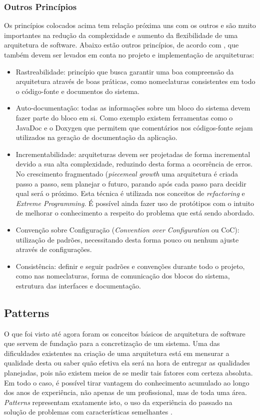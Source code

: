 \documentclass[diss]{template/setrem}
\begin{document}
\subsubsection{Outros Princípios}
Os princípios colocados acima tem relação próxima uns com os outros e são muito importantes na redução da complexidade e aumento da flexibilidade de uma arquitetura de software. Abaixo estão outros princípios, de acordo com \citet{Vogel2011}, que também devem ser levados em conta no projeto e implementação de arquiteturas:
\begin{itemize}
	\item Rastreabilidade: princípio que busca garantir uma boa compreensão da arquitetura através de boas práticas, como nomeclaturas consistentes em todo o código-fonte e documentos do sistema.
	\item Auto-documentação: todas as informações sobre um bloco do sistema devem fazer parte do bloco em si. Como exemplo existem ferramentas como o JavaDoc e o Doxygen que permitem que comentários nos códigos-fonte sejam utilizados na geração de documentação da aplicação.
	\item Incrementabilidade: arquiteturas devem ser projetadas de forma incremental devido a sua alta complexidade, reduzindo desta forma a ocorrência de erros. No crescimento fragmentado (\emph{piecemeal growth} uma arquitetura é criada passo a passo, sem planejar o futuro, parando após cada passo para decidir qual será o próximo. Esta técnica é utilizada nos conceitos de \emph{refactoring} e \emph{Extreme Programming}. É possível ainda fazer uso de protótipos com o intuito de melhorar o conhecimento a respeito do problema que está sendo abordado.
	\item Convenção sobre Configuração (\emph{Convention over Configuration} ou CoC): utilização de padrões, necessitando desta forma pouco ou nenhum ajuste através de configurações.
	\item Consistência: definir e seguir padrões e convenções durante todo o projeto, como nas nomeclaturas, forma de comunicação dos blocos do sistema, estrutura das interfaces e documentação.
\end{itemize}

\subsection{Patterns}
O que foi visto até agora foram os conceitos básicos de arquitetura de software que servem de fundação para a concretização de um sistema. Uma das dificuldades existentes na criação de uma arquitetura está em mensurar a qualidade desta ou saber quão efetiva ela será na hora de entregar as qualidades planejadas, pois não existem meios de se medir tais fatores com certeza absoluta. Em todo o caso, é possível tirar vantagem do conhecimento acumulado ao longo dos anos de experiência, não apenas de um profissional, mas de toda uma área. \emph{Patterns} representam exatamente isto, o uso da experiência do passado na solução de problemas com características semelhantes \citep{Vogel2011}.
\end{document}
